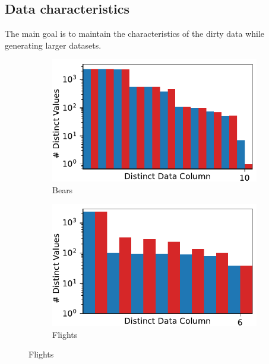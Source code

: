 \subsection{Data characteristics}
The main goal is to maintain the characteristics of the dirty data while generating larger datasets. 

\begin{figure}[!t]
    \centering 
    \centering
\begin{subfigure}{0.4\textwidth}
    \includegraphics[width=\textwidth]{figures/plot/distinct/beers_distinct/combined.pdf}
    \caption{\label{exp:d1}Bears}
    \label{exp:distincts_bears}
\end{subfigure}
\hfill
\begin{subfigure}{0.4\textwidth}
    \includegraphics[width=\textwidth]{figures/plot/distinct/flights_distinct/combined.pdf}
    \caption{Flights}
    \label{exp:distincts_flights}
\end{subfigure}

\end{figure}
